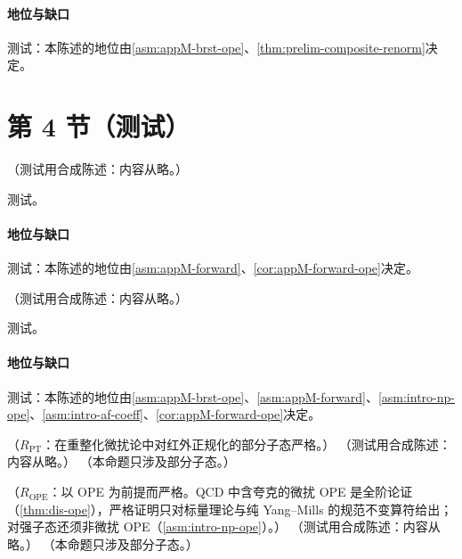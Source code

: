 \paragraph{地位与缺口}测试：本陈述的地位由\cref{asm:appM-brst-ope}、\cref{thm:prelim-composite-renorm}决定。

\section{第 4 节（测试）}\label{sec:dis-np}

\begin{proposition}\label{prop:dis-ope-forward}
（测试用合成陈述：内容从略。）
\end{proposition}
\begin{proofsketch}测试。\end{proofsketch}
\paragraph{地位与缺口}测试：本陈述的地位由\cref{asm:appM-forward}、\cref{cor:appM-forward-ope}决定。

\begin{theorem}\label{thm:dis-ope}
（测试用合成陈述：内容从略。）
\end{theorem}
\begin{proofsketch}测试。\end{proofsketch}
\paragraph{地位与缺口}测试：本陈述的地位由\cref{asm:appM-brst-ope}、\cref{asm:appM-forward}、\cref{asm:intro-np-ope}、\cref{asm:intro-af-coeff}、\cref{cor:appM-forward-ope}决定。

\begin{proposition}\label{prop:dis-chiral-suppression}
（$R_{\mathrm{PT}}$：在重整化微扰论中对红外正规化的部分子态严格。）
（测试用合成陈述：内容从略。）
（本命题只涉及部分子态。）
\end{proposition}

\begin{proposition}\label{prop:dis-wilson-partons}
（$R_{\mathrm{OPE}}$：以 OPE 为前提而严格。QCD 中含夸克的微扰 OPE 是全阶论证（\cref{thm:dis-ope}），严格证明只对标量理论与纯 Yang--Mills 的规范不变算符给出；对强子态还须非微扰 OPE（\cref{asm:intro-np-ope}）。）
（测试用合成陈述：内容从略。）
（本命题只涉及部分子态。）
\end{proposition}

